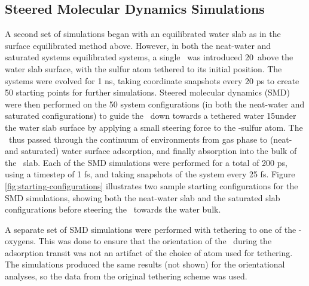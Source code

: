 \subsection{Steered Molecular Dynamics Simulations}

A second set of simulations began with an equilibrated water slab as in the surface equilibrated method above. However, in both the neat-water and saturated systems equilibrated systems, a single \suldiox~was introduced 20\angs~above the water slab surface, with the sulfur atom tethered to its initial position. The systems were evolved for 1 ns, taking coordinate snapshots every 20 ps to create 50 starting points for further simulations. Steered molecular dynamics (SMD) were then performed on the 50 system configurations (in both the neat-water and saturated configurations) to guide the \suldiox~down towards a tethered water 15\angs under the water slab surface by applying a small steering force to the \suldiox-sulfur atom.\cite{Isralewitz2001} The \suldiox~thus passed through the continuum of environments from gas phase to (neat- and saturated) water surface adsorption, and finally absorption into the bulk of the \wat~slab. Each of the SMD simulations were performed for a total of 200 ps, using a timestep of 1 fs, and taking snapshots of the system every 25 fs. Figure \ref{fig:starting-configurations} illustrates two sample starting configurations for the SMD simulations, showing both the neat-water slab and the saturated slab configurations before steering the \suldiox~towards the water bulk.

A separate set of SMD simulations were performed with tethering to one of the \suldiox-oxygens. This was done to ensure that the orientation of the \suldiox~during the adsorption transit was not an artifact of the choice of atom used for tethering. The simulations produced the same results (not shown) for the orientational analyses, so the data from the original tethering scheme was used.

